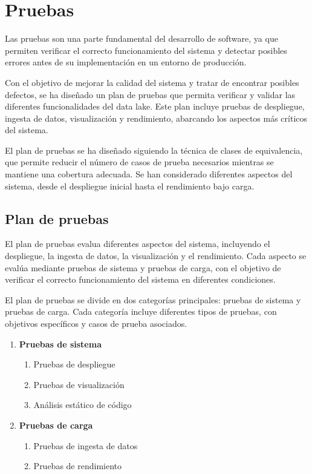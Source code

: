 \chapter{Pruebas}
Las pruebas son una parte fundamental del desarrollo de software, ya que
permiten verificar el correcto funcionamiento del sistema y detectar posibles
errores antes de su implementación en un entorno de producción.

Con el objetivo de mejorar la calidad del sistema y tratar de encontrar posibles
defectos, se ha diseñado un plan de pruebas que permita verificar y
validar las diferentes funcionalidades del data lake. Este plan incluye pruebas
de despliegue, ingesta de datos, visualización y rendimiento, abarcando los
aspectos más críticos del sistema.

El plan de pruebas se ha diseñado siguiendo la técnica de clases de
equivalencia, que permite reducir el número de casos de prueba necesarios
mientras se mantiene una cobertura adecuada. Se han considerado diferentes
aspectos del sistema, desde el despliegue inicial hasta el rendimiento bajo
carga.


\newpage{}
\section{Plan de pruebas}
El plan de pruebas evalua diferentes aspectos del sistema, incluyendo el
despliegue, la ingesta de datos, la visualización y el rendimiento. Cada
aspecto se evalúa mediante pruebas de sistema y pruebas de carga, con el
objetivo de verificar el correcto funcionamiento del sistema en diferentes
condiciones.


El plan de pruebas se divide en dos categorías principales: pruebas de sistema
y pruebas de carga. Cada categoría incluye diferentes tipos de pruebas, con
objetivos específicos y casos de prueba asociados.

\begin{enumerate}
    \item \textbf{Pruebas de sistema} \begin{enumerate}
            \item Pruebas de despliegue
            \item Pruebas de visualización
            \item Análisis estático de código
        \end{enumerate}
    \item \textbf{Pruebas de carga} \begin{enumerate}
            \item Pruebas de ingesta de datos
            \item Pruebas de rendimiento
        \end{enumerate}
\end{enumerate}


